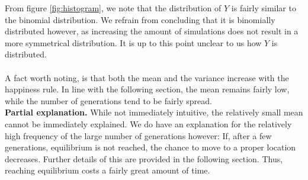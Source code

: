 From figure \ref{fig:histogram}, we note that the distribution of $Y$ is fairly similar to the binomial distribution. We refrain from concluding that it is binomially distributed  however, as increasing the amount of simulations does not result in a more symmetrical distribution. It is up to this point unclear to us how \(Y\) is distributed.\\
\\
A fact worth noting, is that both the mean and the variance increase with the happiness rule. In line with the following section, the mean remains fairly low, while the number of generations tend to be fairly spread.\\
\textbf{Partial explanation.} While not immediately intuitive, the relatively small mean cannot be immediately explained. We do have an explanation for the relatively high frequency of the large number of generations however: If, after a few generations, equilibrium is not reached, the chance to move to a proper location decreases. Further details of this are provided in the following section. Thus, reaching equilibrium costs a fairly great amount of time.